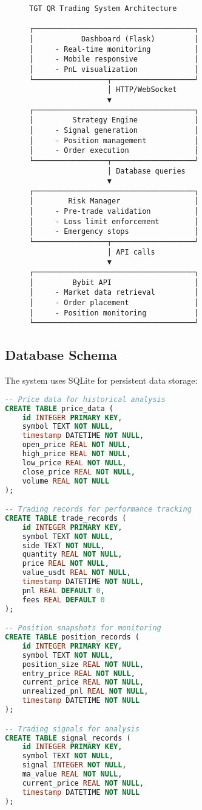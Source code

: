 \documentclass[12pt,a4paper]{article}
\begin{document}
\begin{figure}[H]
\centering
\begin{minipage}{0.8\textwidth}
\begin{verbatim}
TGT QR Trading System Architecture

┌─────────────────────────────────────┐
│           Dashboard (Flask)         │
│     - Real-time monitoring          │
│     - Mobile responsive             │
│     - PnL visualization             │
└─────────────────┬───────────────────┘
                  │ HTTP/WebSocket
                  ▼
┌─────────────────────────────────────┐
│         Strategy Engine             │
│     - Signal generation             │
│     - Position management           │
│     - Order execution               │
└─────────────────┬───────────────────┘
                  │ Database queries
                  ▼
┌─────────────────────────────────────┐
│        Risk Manager                 │
│     - Pre-trade validation          │
│     - Loss limit enforcement        │
│     - Emergency stops               │
└─────────────────┬───────────────────┘
                  │ API calls
                  ▼
┌─────────────────────────────────────┐
│         Bybit API                   │
│     - Market data retrieval         │
│     - Order placement               │
│     - Position monitoring           │
└─────────────────────────────────────┘
\end{verbatim}
\end{minipage}
\end{figure}

\subsection{Database Schema}
The system uses SQLite for persistent data storage:

\begin{lstlisting}[language=SQL, caption=Database Schema]
-- Price data for historical analysis
CREATE TABLE price_data (
    id INTEGER PRIMARY KEY,
    symbol TEXT NOT NULL,
    timestamp DATETIME NOT NULL,
    open_price REAL NOT NULL,
    high_price REAL NOT NULL,
    low_price REAL NOT NULL,
    close_price REAL NOT NULL,
    volume REAL NOT NULL
);

-- Trading records for performance tracking
CREATE TABLE trade_records (
    id INTEGER PRIMARY KEY,
    symbol TEXT NOT NULL,
    side TEXT NOT NULL,
    quantity REAL NOT NULL,
    price REAL NOT NULL,
    value_usdt REAL NOT NULL,
    timestamp DATETIME NOT NULL,
    pnl REAL DEFAULT 0,
    fees REAL DEFAULT 0
);

-- Position snapshots for monitoring
CREATE TABLE position_records (
    id INTEGER PRIMARY KEY,
    symbol TEXT NOT NULL,
    position_size REAL NOT NULL,
    entry_price REAL NOT NULL,
    current_price REAL NOT NULL,
    unrealized_pnl REAL NOT NULL,
    timestamp DATETIME NOT NULL
);

-- Trading signals for analysis
CREATE TABLE signal_records (
    id INTEGER PRIMARY KEY,
    symbol TEXT NOT NULL,
    signal INTEGER NOT NULL,
    ma_value REAL NOT NULL,
    current_price REAL NOT NULL,
    timestamp DATETIME NOT NULL
);
\end{lstlisting}
\end{document}
